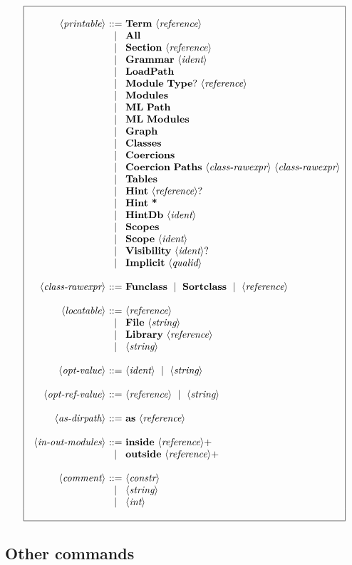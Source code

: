 \documentclass{article}
\makeatletter
\def\NT#1{\langle\textit{#1}\rangle}
\def\TERM#1{{\bf\textrm{\bf #1}}}
\def\KWD#1{\TERM{#1}}
\def\PLUS#1{#1+}
\def\OPT#1{#1?}
\newenvironment{cadre}
        {\begin{array}{|c|}\hline\\}
        {\\\\\hline\end{array}}
\newenvironment{rulebox}
        {$$\begin{cadre}\begin{array}{r@{~}c@{~}l@{}l@{}r}}
        {\end{array}\end{cadre}$$}
\def\DEFNT#1{\NT{#1} & ::= &}
\def\SEPDEF{\\\\}
\def\nlsep{\\&|&}
\newenvironment{rules}
        {\begin{center}\begin{rulebox}}
        {\end{rulebox}\end{center}}
\makeatother
\begin{document}
\begin{rules}
\DEFNT{printable}
       \TERM{Term}~\NT{reference}
\nlsep \TERM{All}
\nlsep \TERM{Section}~\NT{reference}
\nlsep \TERM{Grammar}~\NT{ident}
\nlsep \TERM{LoadPath}
\nlsep \TERM{Module}~\OPT{\KWD{Type}}~\NT{reference}
\nlsep \TERM{Modules}
\nlsep \TERM{ML}~\TERM{Path}
\nlsep \TERM{ML}~\TERM{Modules}
\nlsep \TERM{Graph}
\nlsep \TERM{Classes}
\nlsep \TERM{Coercions}
\nlsep \TERM{Coercion}~\TERM{Paths}~\NT{class-rawexpr}~\NT{class-rawexpr}
\nlsep \TERM{Tables}
\nlsep \TERM{Hint}~\OPT{\NT{reference}}
\nlsep \TERM{Hint}~\TERM{*}
\nlsep \TERM{HintDb}~\NT{ident}
\nlsep \TERM{Scopes}
\nlsep \TERM{Scope}~\NT{ident}
\nlsep \TERM{Visibility}~\OPT{\NT{ident}}
\nlsep \TERM{Implicit}~\NT{qualid}
\SEPDEF
\DEFNT{class-rawexpr}
       \TERM{Funclass}~\mid~\TERM{Sortclass}~\mid~\NT{reference}
\SEPDEF
\DEFNT{locatable}
       \NT{reference}
\nlsep \TERM{File}~\NT{string}
\nlsep \TERM{Library}~\NT{reference}
\nlsep \NT{string}
\SEPDEF
\DEFNT{opt-value}
       \NT{ident} ~\mid~ \NT{string}
\SEPDEF
\DEFNT{opt-ref-value}
       \NT{reference} ~\mid~ \NT{string}
\SEPDEF
\DEFNT{as-dirpath}
       \KWD{as}~\NT{reference}
\SEPDEF
\DEFNT{in-out-modules}
       \TERM{inside}~\PLUS{\NT{reference}}
\nlsep \TERM{outside}~\PLUS{\NT{reference}}
\SEPDEF
\DEFNT{comment}
       \NT{constr}
\nlsep \NT{string}
\nlsep \NT{int}
\end{rules}

\subsection{Other commands}
\end{document}
